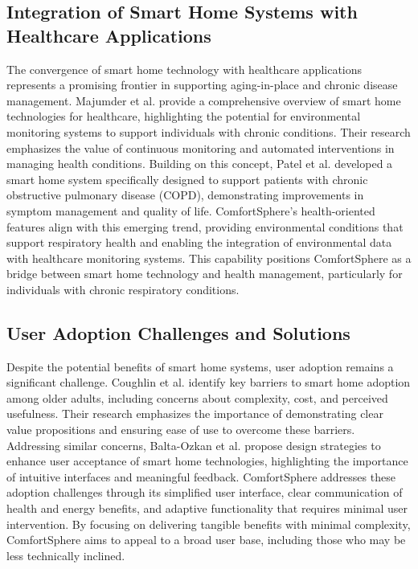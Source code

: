 \documentclass[a4paper]{scrartcl}
\begin{document}
    \subsection{Integration of Smart Home Systems with Healthcare Applications}
    The convergence of smart home technology with healthcare applications represents a promising frontier in supporting aging-in-place and chronic disease management. Majumder et al. \cite{paper21} provide a comprehensive overview of smart home technologies for healthcare, highlighting the potential for environmental monitoring systems to support individuals with chronic conditions. Their research emphasizes the value of continuous monitoring and automated interventions in managing health conditions. Building on this concept, Patel et al. \cite{paper22} developed a smart home system specifically designed to support patients with chronic obstructive pulmonary disease (COPD), demonstrating improvements in symptom management and quality of life. ComfortSphere's health-oriented features align with this emerging trend, providing environmental conditions that support respiratory health and enabling the integration of environmental data with healthcare monitoring systems. This capability positions ComfortSphere as a bridge between smart home technology and health management, particularly for individuals with chronic respiratory conditions.

    \subsection{User Adoption Challenges and Solutions}
    Despite the potential benefits of smart home systems, user adoption remains a significant challenge. Coughlin et al. \cite{paper23} identify key barriers to smart home adoption among older adults, including concerns about complexity, cost, and perceived usefulness. Their research emphasizes the importance of demonstrating clear value propositions and ensuring ease of use to overcome these barriers. Addressing similar concerns, Balta-Ozkan et al. \cite{paper24} propose design strategies to enhance user acceptance of smart home technologies, highlighting the importance of intuitive interfaces and meaningful feedback. ComfortSphere addresses these adoption challenges through its simplified user interface, clear communication of health and energy benefits, and adaptive functionality that requires minimal user intervention. By focusing on delivering tangible benefits with minimal complexity, ComfortSphere aims to appeal to a broad user base, including those who may be less technically inclined.
\end{document}
